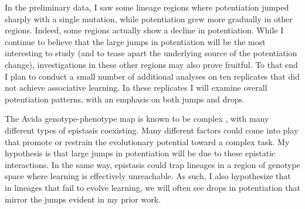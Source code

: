 In the preliminary data, I saw some lineage regions where potentiation jumped sharply with a single mutation, while potentiation grew more gradually in other regions.
Indeed, some regions actually show a decline in potentiation.
While I continue to believe that the large jumps in potentiation will be the most interesting to study (and to tease apart the underlying source of the potentiation change), investigations in these other regions may also prove fruitful.
To that end I plan to conduct a small number of additional analyses on ten replicates that did not achieve associative learning.
In these replicates I will examine overall potentiation patterns, with an emphasis on both jumps and drops.

The Avida genotype-phenotype map is known to be complex \citep{fortunaGenotypephenotypeMapEvolving2017}, with many different types of epistasis coexisting.
Many different factors could come into play that promote or restrain the evolutionary potential toward a complex task.
My hypothesis is that large jumps in potentiation will be due to these epistatic interactions.
In the same way, epistasis could trap lineages in a region of genotype space where learning is effectively unreachable.
As such, I also hypothesize that in lineages that fail to evolve learning, we will often see drops in potentiation that mirror the jumps evident in my prior work.



